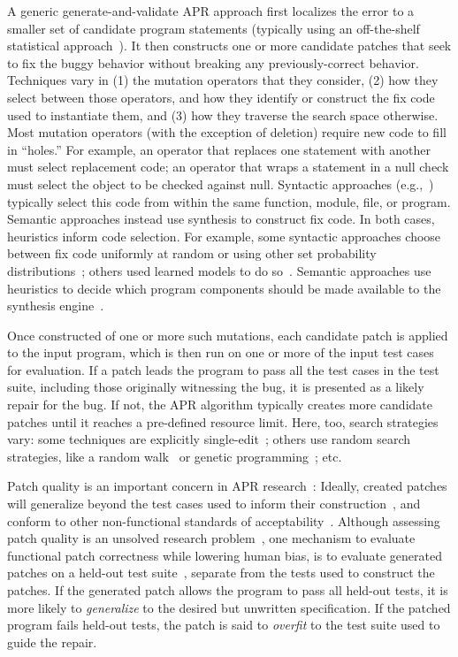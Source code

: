 \documentclass[conference]{IEEEtran}
\begin{document}
A generic generate-and-validate APR approach first
localizes the error to a smaller set of
candidate program statements (typically using an off-the-shelf statistical approach~\cite{Jones02}).  It
then constructs one or more candidate patches that seek to fix the buggy
behavior without breaking any previously-correct behavior.  
Techniques vary in (1) the mutation operators that they consider, (2) how they select
between those operators, and how they identify or
construct the fix code used to instantiate them, and (3) how they traverse
the search space otherwise.  
Most mutation operators (with the exception of deletion) require new code to
fill in ``holes.''  For example, an operator that replaces one statement with
another must select replacement code; an operator that wraps a statement
in a null check must select the object to be checked against null.
Syntactic approaches (e.g.,~\cite{legoues12Genprog,long16proph,kim2013,xuan16}) typically select this code from within the
same function, module, file, or program.  Semantic approaches instead use synthesis to
construct fix code.  
In both cases, heuristics inform code selection.  For example, some syntactic approaches
choose between fix code uniformly at random or using other set probability distributions~\cite{kim2013,legoues12Genprog}; others used learned
models to do so~\cite{long16proph}.  Semantic approaches use heuristics to
decide which program components should be made available to the synthesis
engine~\cite{Mechtaev2016,xuanNopol}. 

Once constructed of one or more such mutations, each candidate patch is
applied to the input program, which is then run on
one or more of the input test cases for evaluation.  If a patch leads the
program to 
pass all the test cases in the test suite, including those originally witnessing
the bug, it is presented as a likely repair for the bug. 
If not, the APR algorithm typically creates more candidate patches 
until it reaches a pre-defined resource limit. 
Here, too, search strategies vary: some techniques 
are explicitly single-edit~\cite{Qi13TrpAutoR,Weimer13,xuanNopol}; others use
random search strategies, like a random walk~\cite{debroy10} or genetic
programming~\cite{kim2013,legoues12,xuan16}; etc. 

Patch quality is an important concern in APR research~\cite{Qi15}: Ideally,
created patches will generalize beyond the test cases used to inform their
construction~\cite{smith15}, and conform to other non-functional standards of
acceptability~\cite{fry2010,kim2013}.  Although assessing patch quality is an
unsolved research problem~\cite{monperrus14critical}, one mechanism to evaluate functional patch
correctness while lowering human bias, is to evaluate generated patches on a held-out test suite~\cite{smith15,legoues12Genprog}, separate
from the tests used to construct the patches. 
If the generated patch allows the program to pass all held-out tests, it is more likely to
\emph{generalize} to the desired but unwritten specification. If the patched
program fails held-out tests, the patch is said to \emph{overfit} to 
the test suite used to guide the repair. 
\end{document}
